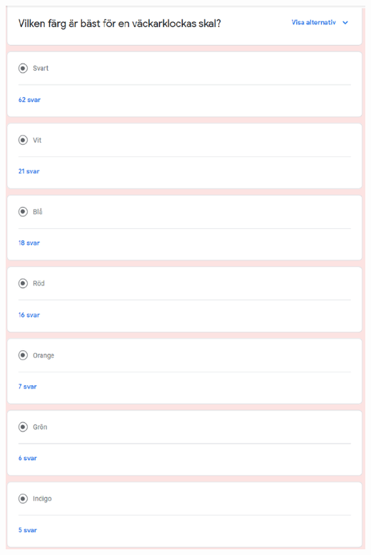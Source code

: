 \documentclass[12pt, a4paper,titlepage]{article}
\begin{document}
            \includegraphics[scale=.7]{fraga1ny.png}            
\end{document}
